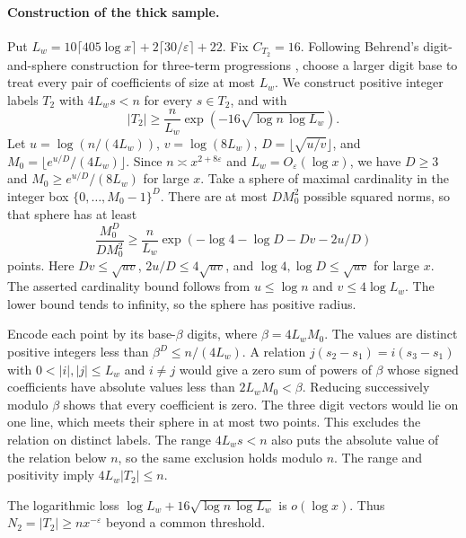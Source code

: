 \paragraph{Construction of the thick sample.}
%
Put \(L_w=10\lceil405\log x\rceil+2\lceil30/\varepsilon\rceil+22\).
Fix \(C_{T_2}=16\).
Following Behrend's digit-and-sphere construction for three-term
progressions \cite[pp.~331--332]{f2-behrend}, choose a larger digit
base to treat every pair of coefficients of size at most \(L_w\).
We construct positive integer labels \(T_2\) with
\(4L_w s<n\) for every \(s\in T_2\), and with
\[
 |T_2|\ge\frac{n}{L_w}\exp\!\left(-16\sqrt{\log n\,\log L_w}\right).
\]
Let \(u=\log(n/(4L_w))\), \(v=\log(8L_w)\),
\(D=\lfloor\sqrt{u/v}\rfloor\), and
\(M_0=\lfloor e^{u/D}/(4L_w)\rfloor\). Since
\(n\asymp x^{2+8\varepsilon}\) and \(L_w=O_\varepsilon(\log x)\),
we have \(D\ge3\) and \(M_0\ge e^{u/D}/(8L_w)\) for large \(x\).
Take a sphere of maximal cardinality in the integer box
\(\{0,\ldots,M_0-1\}^{D}\). There are at most \(D M_0^2\)
possible squared norms, so that sphere has at least
\[
 \frac{M_0^{D}}{D M_0^2}
 \ge\frac{n}{L_w}
     \exp\!\left(-\log 4-\log D-Dv-2u/D\right)
\]
points. Here \(Dv\le\sqrt{uv}\), \(2u/D\le4\sqrt{uv}\), and
\(\log 4,\log D\le\sqrt{uv}\) for large \(x\). The asserted
cardinality bound follows from \(u\le\log n\) and
\(v\le4\log L_w\). The lower bound tends to infinity, so the
sphere has positive radius.

Encode each point by its base-\(\beta\) digits, where
\(\beta=4L_wM_0\). The values are distinct positive integers less
than \(\beta^D\le n/(4L_w)\). A relation
\(j(s_2-s_1)=i(s_3-s_1)\) with \(0<|i|,|j|\le L_w\) and
\(i\ne j\) would give a zero sum of powers of \(\beta\) whose signed
coefficients have absolute values less than \(2L_wM_0<\beta\).
Reducing successively modulo \(\beta\) shows that every coefficient
is zero. The three digit vectors would lie on one line, which meets
their sphere in at most two points. This excludes the relation on
distinct labels. The range \(4L_ws<n\) also puts the absolute value
of the relation below \(n\), so the same exclusion holds modulo \(n\).
The range and positivity imply \(4L_w|T_2|\le n\).

The logarithmic loss \(\log L_w+16\sqrt{\log n\,\log L_w}\) is
\(o(\log x)\). Thus \(N_2=|T_2|\ge nx^{-\varepsilon}\) beyond a
common threshold.

